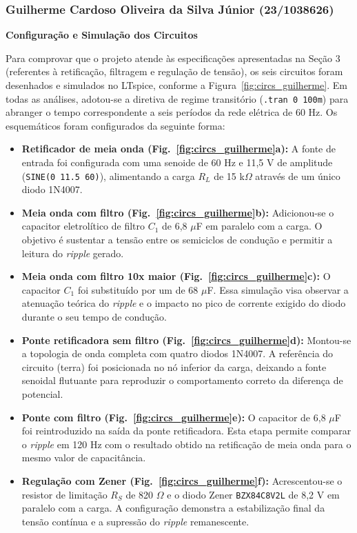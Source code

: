 \documentclass[11pt,a4paper]{article}
\begin{document}
\subsubsection{Guilherme Cardoso Oliveira da Silva Júnior (23/1038626)}

\textbf{Configuração e Simulação dos Circuitos}

Para comprovar que o projeto atende às especificações apresentadas na Seção 3 (referentes à retificação, filtragem e regulação de tensão), os seis circuitos foram desenhados e simulados no LTspice, conforme a Figura~\ref{fig:circs_guilherme}. Em todas as análises, adotou-se a diretiva de regime transitório (\texttt{.tran 0 100m}) para abranger o tempo correspondente a seis períodos da rede elétrica de 60 Hz. Os esquemáticos foram configurados da seguinte forma:

\begin{itemize}
    \item \textbf{Retificador de meia onda (Fig.~\ref{fig:circs_guilherme}a):} A fonte de entrada foi configurada com uma senoide de 60 Hz e 11,5 V de amplitude (\texttt{SINE(0 11.5 60)}), alimentando a carga $R_L$ de 15 k$\Omega$ através de um único diodo 1N4007. 
    
    \item \textbf{Meia onda com filtro (Fig.~\ref{fig:circs_guilherme}b):} Adicionou-se o capacitor eletrolítico de filtro $C_1$ de 6,8 $\mu$F em paralelo com a carga. O objetivo é sustentar a tensão entre os semiciclos de condução e permitir a leitura do \textit{ripple} gerado.

    \item \textbf{Meia onda com filtro 10x maior (Fig.~\ref{fig:circs_guilherme}c):} O capacitor $C_1$ foi substituído por um de 68 $\mu$F. Essa simulação visa observar a atenuação teórica do \textit{ripple} e o impacto no pico de corrente exigido do diodo durante o seu tempo de condução.
    
    \item \textbf{Ponte retificadora sem filtro (Fig.~\ref{fig:circs_guilherme}d):} Montou-se a topologia de onda completa com quatro diodos 1N4007. A referência do circuito (terra) foi posicionada no nó inferior da carga, deixando a fonte senoidal flutuante para reproduzir o comportamento correto da diferença de potencial.

    \item \textbf{Ponte com filtro (Fig.~\ref{fig:circs_guilherme}e):} O capacitor de 6,8 $\mu$F foi reintroduzido na saída da ponte retificadora. Esta etapa permite comparar o \textit{ripple} em 120 Hz com o resultado obtido na retificação de meia onda para o mesmo valor de capacitância.

    \item \textbf{Regulação com Zener (Fig.~\ref{fig:circs_guilherme}f):} Acrescentou-se o resistor de limitação $R_S$ de 820 $\Omega$ e o diodo Zener \texttt{BZX84C8V2L} de 8,2 V em paralelo com a carga. A configuração demonstra a estabilização final da tensão contínua e a supressão do \textit{ripple} remanescente.
\end{itemize}
\end{document}
